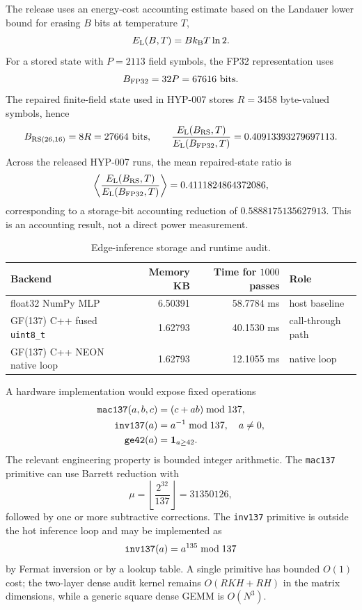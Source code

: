 \documentclass[11pt]{article}
\begin{document}
The release uses an energy-cost accounting estimate based on the Landauer lower
bound for erasing $B$ bits at temperature $T$,
\begin{equation}
    E_{\rm L}(B,T)=B k_{\rm B}T\ln2.
\end{equation}
For a stored state with $P=2113$ field symbols, the FP32 representation uses
\begin{equation}
    B_{\rm FP32}=32P=67616~{\rm bits}.
\end{equation}
The repaired finite-field state used in HYP-007 stores
$R=3458$ byte-valued symbols, hence
\begin{equation}
    B_{\rm RS(26,16)}=8R=27664~{\rm bits},
    \qquad
    \frac{E_{\rm L}(B_{\rm RS},T)}{E_{\rm L}(B_{\rm FP32},T)}
    =
    0.40913393279697113.
\end{equation}
Across the released HYP-007 runs, the mean repaired-state ratio is
\begin{equation}
    \left\langle
    \frac{E_{\rm L}(B_{\rm RS},T)}{E_{\rm L}(B_{\rm FP32},T)}
    \right\rangle
    =
    0.4111824864372086,
\end{equation}
corresponding to a storage-bit accounting reduction of
$0.5888175135627913$.  This is an accounting result, not a direct power
measurement.

\begin{table}[h]
\centering
\caption{Edge-inference storage and runtime audit.}
\begin{tabular}{lrrl}
\toprule
Backend & Memory KB & Time for $1000$ passes & Role \\
\midrule
float32 NumPy MLP & 6.50391 & 58.7784 ms & host baseline \\
GF(137) C++ fused \texttt{uint8\_t} & 1.62793 & 40.1530 ms & call-through path \\
GF(137) C++ NEON native loop & 1.62793 & 12.1055 ms & native loop \\
\bottomrule
\end{tabular}
\end{table}

A hardware implementation would expose fixed operations
\begin{align}
    {\tt mac137}(a,b,c)&=(c+ab)\bmod137,\\
    {\tt inv137}(a)&=a^{-1}\bmod137,\quad a\ne0,\\
    {\tt ge42}(a)&=\mathbf{1}_{a\ge42}.
\end{align}
The relevant engineering property is bounded integer arithmetic.  The
\texttt{mac137} primitive can use Barrett reduction with
\begin{equation}
    \mu=\left\lfloor\frac{2^{32}}{137}\right\rfloor=31350126,
\end{equation}
followed by one or more subtractive corrections.  The \texttt{inv137}
primitive is outside the hot inference loop and may be implemented as
\begin{equation}
    {\tt inv137}(a)=a^{135}\bmod137
\end{equation}
by Fermat inversion or by a lookup table.  A single primitive has bounded
$O(1)$ cost; the two-layer dense audit kernel remains
$O(RKH+RH)$ in the matrix dimensions, while a generic square dense GEMM is
$O(N^3)$.
\end{document}

